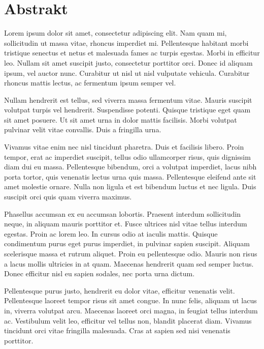 \section*{Abstrakt}



Lorem ipsum dolor sit amet, consectetur adipiscing elit. Nam quam mi, sollicitudin ut massa vitae, rhoncus imperdiet mi. Pellentesque habitant morbi tristique senectus et netus et malesuada fames ac turpis egestas. Morbi in efficitur leo. Nullam sit amet suscipit justo, consectetur porttitor orci. Donec id aliquam ipsum, vel auctor nunc. Curabitur ut nisl ut nisl vulputate vehicula. Curabitur rhoncus mattis lectus, ac fermentum ipsum semper vel.

Nullam hendrerit est tellus, sed viverra massa fermentum vitae. Mauris suscipit volutpat turpis vel hendrerit. Suspendisse potenti. Quisque tristique eget quam sit amet posuere. Ut sit amet urna in dolor mattis facilisis. Morbi volutpat pulvinar velit vitae convallis. Duis a fringilla urna.

Vivamus vitae enim nec nisl tincidunt pharetra. Duis et facilisis libero. Proin tempor, erat ac imperdiet suscipit, tellus odio ullamcorper risus, quis dignissim diam dui eu massa. Pellentesque bibendum, orci a volutpat imperdiet, lacus nibh porta tortor, quis venenatis lectus urna quis massa. Pellentesque eleifend ante sit amet molestie ornare. Nulla non ligula et est bibendum luctus et nec ligula. Duis suscipit orci quis quam viverra maximus.

Phasellus accumsan ex eu accumsan lobortis. Praesent interdum sollicitudin neque, in aliquam mauris porttitor et. Fusce ultrices nisl vitae tellus interdum egestas. Proin ac lorem leo. In cursus odio at iaculis mattis. Quisque condimentum purus eget purus imperdiet, in pulvinar sapien suscipit. Aliquam scelerisque massa et rutrum aliquet. Proin eu pellentesque odio. Mauris non risus a lacus mollis ultricies in at quam. Maecenas hendrerit quam sed semper luctus. Donec efficitur nisl eu sapien sodales, nec porta urna dictum.

Pellentesque purus justo, hendrerit eu dolor vitae, efficitur venenatis velit. Pellentesque laoreet tempor risus sit amet congue. In nunc felis, aliquam ut lacus in, viverra volutpat arcu. Maecenas laoreet orci magna, in feugiat tellus interdum ac. Vestibulum velit leo, efficitur vel tellus non, blandit placerat diam. Vivamus tincidunt orci vitae fringilla malesuada. Cras at sapien sed nisi venenatis porttitor. 